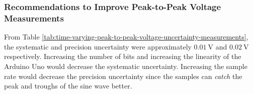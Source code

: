 \subsubsection{Recommendations to Improve Peak-to-Peak Voltage Measurements}
\noindent From Table \ref{tab:time-varying-peak-to-peak-voltage-uncertainty-measurements}, the systematic and precision uncertainty were approximately
$\qty{0.01}{\volt}$ and $\qty{0.02}{\volt}$ respectively. Increasing the number of bits and increasing the linearity of the Arduino Uno would decrease the systematic uncertainty.
Increasing the sample rate would decrease the precision uncertainty since the samples can \textit{catch} the peak and troughs of the sine wave better.









        
